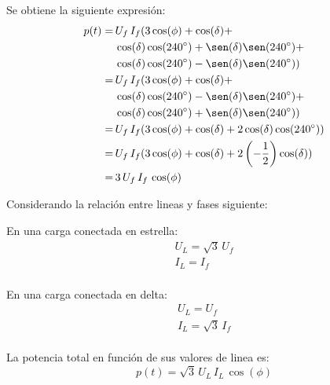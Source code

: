 \documentclass[letter,11pt]{article}
\begin{document}
\begin{enumerate}
Se obtiene la siguiente expresión:
\begin{equation*}
    \begin{split}
        p(t) =\,& U_f\,I_f(
                  3\cos(\phi)+
                  \cos(\delta)+\\
                & \cos(\delta)\cos(240^{\circ})+\sen(\delta)\sen(240^{\circ})+\\
                & \cos(\delta)\cos(240^{\circ})-\sen(\delta)\sen(240^{\circ}))\\
             =\,& U_f\,I_f(
                  3\cos(\phi)+
                  \cos(\delta)+\\
                & \cos(\delta)\cos(240^{\circ})-\sen(\delta)\sen(240^{\circ})+\\
                & \cos(\delta)\cos(240^{\circ})+\sen(\delta)\sen(240^{\circ}))\\
             =\,& U_f\,I_f(
                  3\cos(\phi)+
                  \cos(\delta)+
                  2\cos(\delta)\cos(240^{\circ}))\\
             =\,& U_f\,I_f(
                  3\cos(\phi)+
                  \cos(\delta)+
                  2\left(-\frac{1}{2}\right)\cos(\delta))\\
             =\,& 3\,U_f\,I_f\,\cos(\phi)\\
    \end{split}
\end{equation*}

Considerando la relación entre lineas y fases siguiente:

En una carga conectada en estrella:
\begin{equation*}
    \begin{split}
        U_L = \sqrt{3}\,U_f\\
        I_L = I_f\\
    \end{split}
\end{equation*}

En una carga conectada en delta:
\begin{equation*}
    \begin{split}
        U_L = U_f\\
        I_L = \sqrt{3}\,I_f\\
    \end{split}
\end{equation*}

La potencia total en función de sus valores de linea es:
\begin{equation*}
    p(t) = \sqrt{3}\,U_L\,I_L\,\cos(\phi)
\end{equation*}


\end{enumerate}
\end{document}
